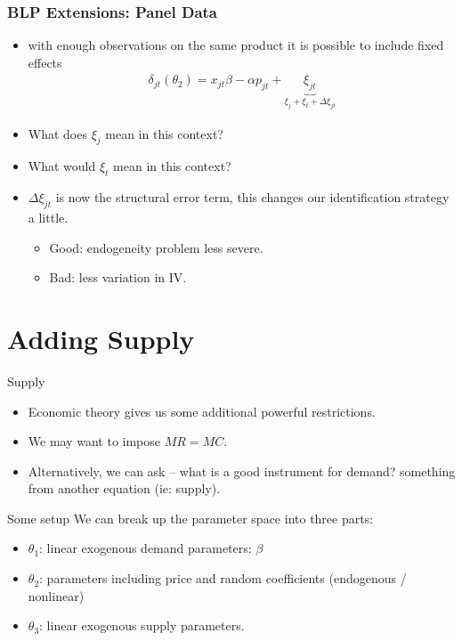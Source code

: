 \begin{frame}
\frametitle{BLP Extensions: Panel Data}
\begin{itemize}
\item with enough observations on the same product it is possible to include fixed effects
\begin{eqnarray*}
\delta_{jt}(\theta_2) = x_{jt} \beta - \alpha p_{jt} + \underbrace{\xi_{jt}}_{\xi_{j} + \xi_t + \Delta \xi_{jt}}
\end{eqnarray*}
\item What does $\xi_{j}$ mean in this context?
\item What would $\xi_t$ mean in this context?
\item $\Delta \xi_{jt}$ is now the structural error term, this changes our identification strategy a little. 
\begin{itemize}
\item Good: endogeneity problem less severe.
\item Bad: less variation in IV.
\end{itemize}
\end{itemize}
\end{frame}


\section{Adding Supply}
\begin{frame}{Supply}
\begin{itemize}
\item Economic theory gives us some additional powerful restrictions.
\item We may want to impose $MR = MC$.
\item Alternatively, we can ask -- what is a good instrument for demand? \alert{something from another equation} (ie: supply).
\end{itemize}
\end{frame}

\begin{frame}{Some setup}
We can break up the parameter space into three parts:
\begin{itemize}
\item $\theta_1$: linear exogenous demand parameters: $\beta$ 
 \item $\theta_2$: parameters including price and random coefficients (endogenous / nonlinear)
 \item $\theta_3$: linear exogenous supply parameters.
\end{itemize}
\end{frame}


